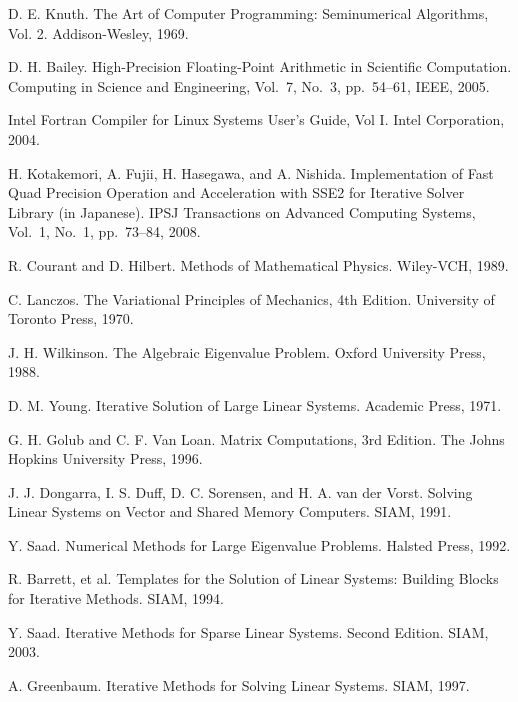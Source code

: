 \documentclass[a4paper]{jarticle}
\begin{document}
{{\begin{thebibliography}{10}
D. E. Knuth. 
The Art of Computer Programming: Seminumerical Algorithms, Vol. 2.
Addison-Wesley, 1969.

D. H. Bailey.
\newblock High-Precision Floating-Point Arithmetic in Scientific Computation.
\newblock Computing in Science and Engineering, Vol.~7, No.~3, pp.\ 54--61, IEEE, 2005.

\newblock Intel Fortran Compiler for Linux Systems User's Guide, Vol I.
\newblock Intel Corporation, 2004.

H. Kotakemori, A. Fujii, H. Hasegawa, and A. Nishida.
\newblock Implementation of Fast Quad Precision Operation and
	Acceleration with SSE2 for Iterative Solver Library (in
	Japanese).
\newblock IPSJ Transactions on Advanced Computing Systems,  Vol.~1, No.~1, pp.\ 73--84, 2008.

R. Courant and D. Hilbert.
\newblock Methods of Mathematical Physics. 
\newblock Wiley-VCH, 1989.

C. Lanczos. 
\newblock The Variational Principles of Mechanics, 4th Edition. 
\newblock University of Toronto Press, 1970.

J. H. Wilkinson. 
\newblock The Algebraic Eigenvalue Problem. 
\newblock Oxford University Press, 1988.

D. M. Young. 
\newblock Iterative Solution of Large Linear Systems. 
\newblock Academic Press, 1971.

G. H. Golub and C. F. Van Loan.
\newblock Matrix Computations, 3rd Edition.
\newblock The Johns Hopkins University Press, 1996.

J. J. Dongarra, I. S. Duff, D. C. Sorensen, and H. A. van der Vorst.
\newblock Solving Linear Systems on Vector and Shared Memory Computers.
\newblock SIAM, 1991.

Y. Saad.
\newblock Numerical Methods for Large Eigenvalue Problems. 
\newblock Halsted Press, 1992.

R. Barrett, et al.
\newblock Templates for the Solution of Linear Systems: Building Blocks for Iterative Methods.
\newblock SIAM, 1994.

Y. Saad.
\newblock Iterative Methods for Sparse Linear Systems. Second Edition. 
\newblock SIAM, 2003.

A. Greenbaum.
\newblock Iterative Methods for Solving Linear Systems.
\newblock SIAM, 1997.


\end{thebibliography}}}
\end{document}
